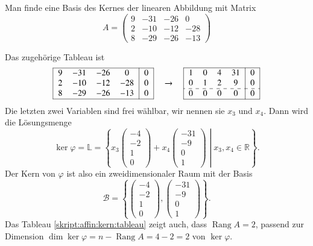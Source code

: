 \begin{beispiel}
Man finde eine Basis des Kernes der linearen Abbildung mit Matrix
\[
A=\begin{pmatrix}
    9& -31& -26&   0\\
    2& -10& -12& -28\\
    8& -29& -26& -13
\end{pmatrix}
\]
\smallskip

{\parindent0pt Das} zugehörige Tableau ist
\begin{equation}
\begin{tabular}{|>{$}c<{$}>{$}c<{$}>{$}c<{$}>{$}c<{$}|>{$}c<{$}|}
\hline
    9& -31& -26&   0&0\\
    2& -10& -12& -28&0\\
    8& -29& -26& -13&0\\
\hline
\end{tabular}
\quad\rightarrow\quad
\begin{tabular}{|>{$}c<{$}>{$}c<{$}>{$}c<{$}>{$}c<{$}|>{$}c<{$}|}
\hline
    1&   0&   4&  31&0\\
    0&   1&   2&   9&0\\
\hdashline
    0&   0&   0&   0&0\\
\hline
\end{tabular}
\label{skript:affin:kern:tableau}
\end{equation}
Die letzten zwei Variablen sind frei wählbar, wir nennen sie $x_3$ und $x_4$.
Dann wird die Lösungsmenge
\[
\ker\varphi
=
\mathbb L
=
\left\{
\left.
x_3
\begin{pmatrix}
-4\\-2\\1\\0
\end{pmatrix}
+
x_4
\begin{pmatrix}
-31\\-9\\0\\1
\end{pmatrix}
\;
\right|
\;
x_3,x_4\in\mathbb R
\right\}.
\]
Der Kern von $\varphi$ ist also ein zweidimensionaler Raum mit der Basis
\[
\mathcal{B} = \left\{
\begin{pmatrix}
-4\\-2\\1\\0
\end{pmatrix},
\begin{pmatrix}
-31\\-9\\0\\1
\end{pmatrix}
\right\}.
\]
Das Tableau \eqref{skript:affin:kern:tableau} zeigt auch, dass
$\operatorname{Rang}A=2$,
passend zur Dimension $\dim\ker\varphi = n - \operatorname{Rang}A = 4-2=2$ von
$\ker\varphi$.
\end{beispiel}


